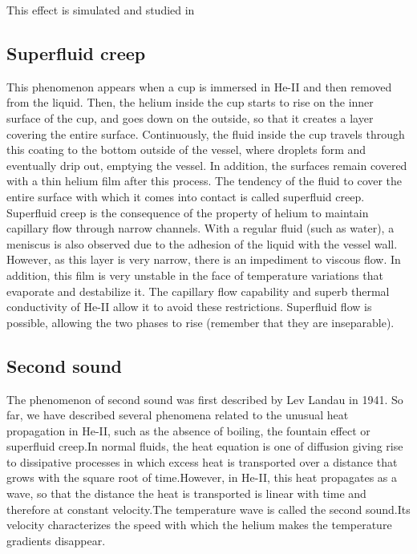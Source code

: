 \documentclass{article}
\begin{document}
This effect is simulated and studied in \cite{Kincl}

\subsection{Superfluid creep}

This phenomenon appears when a cup is immersed in He-II and then removed from the liquid. Then, the helium inside the cup starts to rise on the inner surface of the cup, and goes down on the outside, so that it creates a layer covering the entire surface. Continuously, the fluid inside the cup travels through this coating to the bottom outside of the vessel, where droplets form and eventually drip out, emptying the vessel. In addition, the surfaces remain covered with a thin helium film after this process. The tendency of the fluid to cover the entire surface with which it comes into contact is called superfluid creep.
\\

Superfluid creep is the consequence of the property of helium to maintain capillary flow through narrow channels. With a regular fluid (such as water), a meniscus is also observed due to the adhesion of the liquid with the vessel wall. However, as this layer is very narrow, there is an impediment to viscous flow. In addition, this film is very unstable in the face of temperature variations that evaporate and destabilize it. The capillary flow capability and superb thermal conductivity of He-II allow it to avoid these restrictions. Superfluid flow is possible, allowing the two phases to rise (remember that they are inseparable).
\\

\subsection{Second sound}

The phenomenon of second sound was first described by Lev Landau in 1941. \cite{LevLan}
So far, we have described several phenomena related to the unusual heat propagation in He-II, such as the absence of boiling, the fountain effect or superfluid creep.In normal fluids, the heat equation is one of diffusion giving rise to dissipative processes in which excess heat is transported over a distance that grows with the square root of time.However, in He-II, this heat propagates as a wave, so that the distance the heat is transported is linear with time and therefore at constant velocity.The temperature wave is called the second sound.Its velocity characterizes the speed with which the helium makes the temperature gradients disappear.\\
\end{document}

